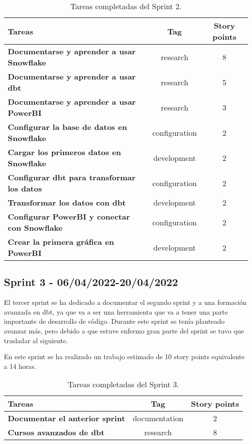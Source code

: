 \begin{table}[ht!]
    \centering
    \resizebox{15cm}{!} {
    \begin{tabular}{|l|c|c|}
    \hline
    \textbf{Tareas}     &\textbf{Tag}     & \textbf{Story points} \\ \hline
    \textbf{Documentarse y aprender a usar Snowflake}         &research      &8 \\ \hline 
    \textbf{Documentarse y aprender a usar dbt}         &research      &5 \\ \hline
    \textbf{Documentarse y aprender a usar PowerBI}         &research      &3 \\ \hline 
    \textbf{Configurar la base de datos en Snowflake}         &configuration      &2 \\ \hline 
    \textbf{Cargar los primeros datos en Snowflake}         &development      &2 \\ \hline 
    \textbf{Configurar dbt para transformar los datos}         &configuration      &2 \\ \hline
    \textbf{Transformar los datos con dbt}         &development      &2 \\ \hline 
    \textbf{Configurar PowerBI y conectar con Snowflake}         &configuration      &2 \\ \hline 
    \textbf{Crear la primera gráfica en PowerBI}         &development      &2 \\ \hline 
    \end{tabular}}
    \caption{Tareas completadas del Sprint 2.}
    \label{tab:my_label}
\end{table}

\subsection{Sprint 3 - 06/04/2022-20/04/2022}
El tercer sprint se ha dedicado a documentar el segundo sprint y a una formación avanzada en dbt, ya que va a ser una herramienta que va a tener una parte importante de desarrollo de código. Durante este sprint se tenía planteado avanzar más, pero debido a que estuve enfermo gran parte del sprint se tuvo que trasladar al siguiente.


En este sprint se ha realizado un trabajo estimado de 10 story points equivalente a 14 horas.

\begin{table}[ht!]
    \centering
    \resizebox{15cm}{!} {
    \begin{tabular}{|l|c|c|}
    \hline
    \textbf{Tareas}     &\textbf{Tag}     & \textbf{Story points} \\ \hline
    \textbf{Documentar el anterior sprint}         &documentation      &2 \\ \hline 
    \textbf{Cursos avanzados de dbt}         &research      &8 \\ \hline 
    \end{tabular}}
    \caption{Tareas completadas del Sprint 3.}
    \label{tab:my_label}
\end{table}

